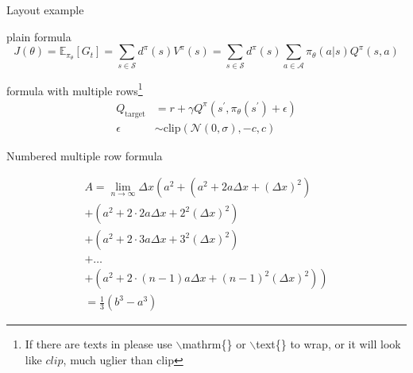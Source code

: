 \documentclass{beamer}
\begin{document}
\begin{frame}{Layout example}
    \begin{exampleblock}{plain formula} %
        \begin{equation*}
            J(\theta) = \mathbb{E}_{\pi_\theta}[G_t] = \sum_{s\in\mathcal{S}} d^\pi (s)V^\pi(s)=\sum_{s\in\mathcal{S}} d^\pi(s)\sum_{a\in\mathcal{A}}\pi_\theta(a|s)Q^\pi(s,a)
        \end{equation*}
    \end{exampleblock}
    \begin{exampleblock}{formula with multiple rows\footnote{If there are texts in please use $\backslash$mathrm\{\} or $\backslash$text\{\} to wrap, or it will look like $clip$, much uglier than $\mathrm{clip}$}}
        \begin{align}
            Q_\mathrm{target}&=r+\gamma Q^\pi(s^\prime, \pi_\theta(s^\prime)+\epsilon)\\
            \epsilon&\sim\mathrm{clip}(\mathcal{N}(0, \sigma), -c, c)\nonumber
        \end{align}
    \end{exampleblock}
\end{frame}

\begin{frame}
    \begin{exampleblock}{Numbered multiple row formula}
    
        \begin{multline}
            A=\lim_{n\rightarrow\infty}\Delta x\left(a^{2}+\left(a^{2}+2a\Delta x+\left(\Delta x\right)^{2}\right)\right.\label{eq:reset}\\
            +\left(a^{2}+2\cdot2a\Delta x+2^{2}\left(\Delta x\right)^{2}\right)\\
            +\left(a^{2}+2\cdot3a\Delta x+3^{2}\left(\Delta x\right)^{2}\right)\\
            +\ldots\\
            \left.+\left(a^{2}+2\cdot(n-1)a\Delta x+(n-1)^{2}\left(\Delta x\right)^{2}\right)\right)\\
            =\frac{1}{3}\left(b^{3}-a^{3}\right)
        \end{multline}
    \end{exampleblock}
\end{frame}
\end{document}
